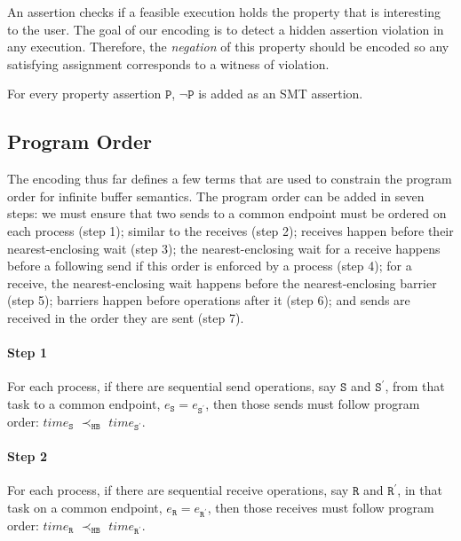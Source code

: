 An assertion checks if a feasible execution holds the property that is interesting to the user. The goal of our encoding is to detect a hidden assertion violation in any execution. Therefore, the \textit{negation} of this property should be encoded so any satisfying assignment corresponds to a witness of violation. 

\begin{definition} \label{def:assert}
For every property assertion $\mathtt{P}$, $\neg \mathtt{P}$ is added as
an SMT assertion.
\end{definition}

\subsection{Program Order}
The encoding thus far defines a few terms that are used to constrain the program order for infinite buffer semantics. The program order can be added in seven steps: we must ensure that two sends to a common endpoint must be ordered on each process (step 1); similar to the receives (step 2); receives happen before their nearest-enclosing wait (step 3); the nearest-enclosing wait for a receive happens before a following send if this order is enforced by a process (step 4); for a receive, the nearest-enclosing wait happens before the nearest-enclosing barrier (step 5); barriers happen before operations after it (step 6); and sends are received in the order they are sent (step 7). 

\paragraph*{Step 1} For each process, if there are sequential send
operations, say $\mathtt{S}$ and $\mathtt{S^\prime}$, from that task
to a common endpoint, $e_\mathtt{S} = e_\mathtt{S^\prime}$, then those
sends must follow program order: $\mathit{time}_\mathtt{S}$
$\prec_\mathtt{HB}$ $\mathit{time}_\mathtt{S^\prime}$.

\paragraph*{Step 2} For each process, if there are sequential receive
operations, say $\mathtt{R}$ and $\mathtt{R^\prime}$, in that task
on a common endpoint, $e_\mathtt{R} = e_\mathtt{R^\prime}$, then those
receives must follow program order: $\mathit{time}_\mathtt{R}$
$\prec_\mathtt{HB}$ $\mathit{time}_\mathtt{R^\prime}$.

